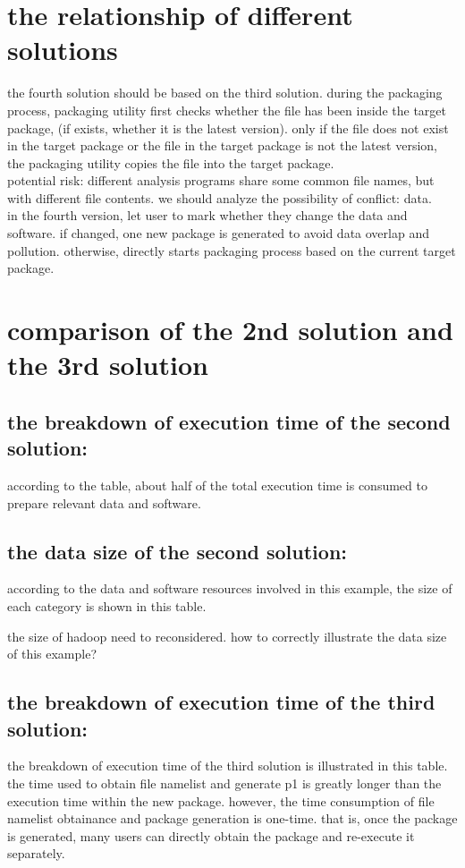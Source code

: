\documentclass{article}
\begin{document}
\section{the relationship of different solutions}

the fourth solution should be based on the third solution. during the packaging process, packaging utility first checks whether the file has been inside the target package, (if exists, whether it is the latest version). only if the file does not exist in the target package or the file in the target package is not the latest version, the packaging utility copies the file into the target package.\\

potential risk: different analysis programs share some common file names, but with different file contents. we should analyze the possibility of conflict: data.\\

in the fourth version, let user to mark whether they change the data and software. if changed, one new package is generated to avoid data overlap and pollution. otherwise, directly starts packaging process based on the current target package. \\

\section{comparison of the 2nd solution and the 3rd solution}
\subsection{the breakdown of execution time of the second solution: }
according to the table, about half of the total execution time is consumed to prepare relevant data and software.

\subsection{the data size of the second solution:}
according to the data and software resources involved in this example, the size of each category is shown in this table. 

the size of hadoop need to reconsidered. how to correctly illustrate the data size of this example?\\

\subsection{the breakdown of execution time of the third solution: }
the breakdown of execution time of the third solution is illustrated in this table. the time used to obtain file namelist and generate p1 is greatly longer than the execution time within the new package. however, the time consumption of file namelist obtainance and package generation is one-time. that is, once the package is generated, many users can directly obtain the package and re-execute it separately.
\end{document}
